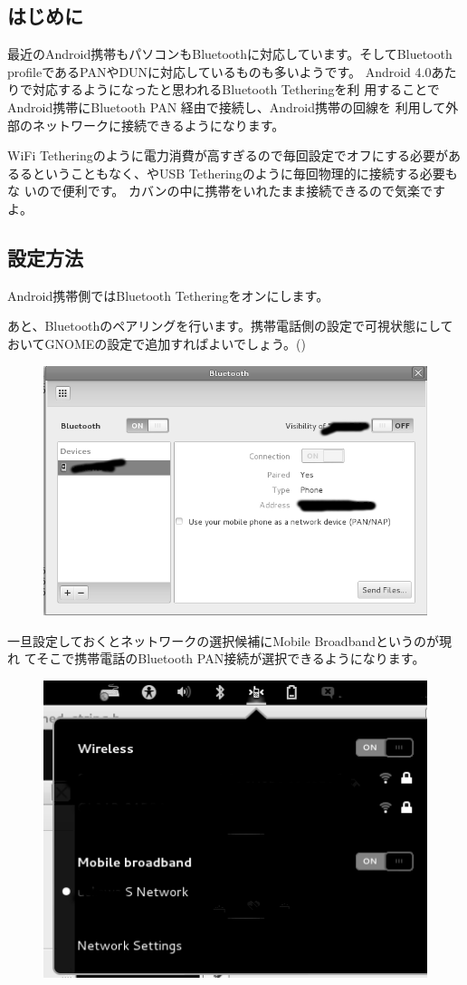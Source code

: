 \documentclass[mingoth,a4paper]{jsarticle}
\begin{document}
\subsection{はじめに}

最近のAndroid携帯もパソコンもBluetoothに対応しています。そしてBluetooth
profileであるPANやDUNに対応しているものも多いようです。
Android 4.0あたりで対応するようになったと思われるBluetooth Tetheringを利
用することでAndroid携帯にBluetooth PAN 経由で接続し、Android携帯の回線を
利用して外部のネットワークに接続できるようになります。

WiFi Tetheringのように電力消費が高すぎるので毎回設定でオフにする必要があ
るるということもなく、やUSB Tetheringのように毎回物理的に接続する必要もな
いので便利です。
カバンの中に携帯をいれたまま接続できるので気楽ですよ。

\subsection{設定方法}

Android携帯側ではBluetooth Tetheringをオンにします。

あと、Bluetoothのペアリングを行います。携帯電話側の設定で可視状態にして
おいてGNOMEの設定で追加すればよいでしょう。()

\begin{figure}[ht]
 \begin{center}
  \includegraphics[width=0.5\hsize]{image201211/bt2_mono.png}
  \label{fig:gnome-bt2}
 \end{center}
\end{figure}

一旦設定しておくとネットワークの選択候補にMobile Broadbandというのが現れ
てそこで携帯電話のBluetooth PAN接続が選択できるようになります。

\begin{figure}[ht]
 \begin{center}
  \includegraphics[width=0.5\hsize]{image201211/bt1_mono.png}
  \label{fig:gnome-bt1}
 \end{center}
\end{figure}
\end{document}
